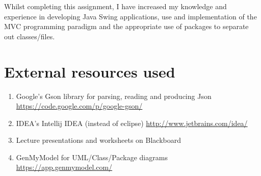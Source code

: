 \documentclass[a4paper, 11pt]{article}
\begin{document}
Whilst completing this assignment, I have increased my knowledge and experience in developing Java Swing applications, use and implementation of the MVC programming paradigm and the appropriate use of packages to separate out classes/files.
\section{External resources used}

\begin{enumerate}
\item Google's Gson library for parsing, reading and producing Json \url{https://code.google.com/p/google-gson/}
\item IDEA's Intellij IDEA (instead of eclipse) \url{http://www.jetbrains.com/idea/} 
\item Lecture presentations and worksheets on Blackboard
\item GenMyModel for UML/Class/Package diagrams \url{https://app.genmymodel.com/}
\end{enumerate}
\end{document}
